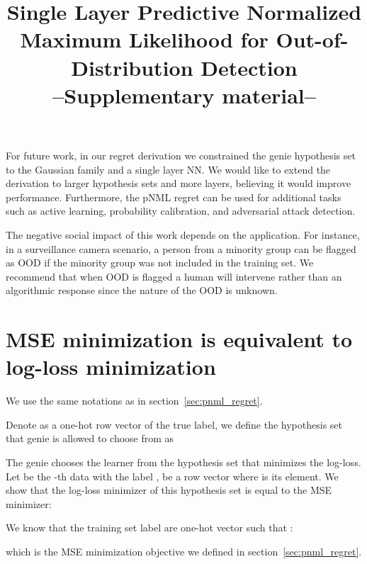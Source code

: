 \documentclass{article}
\def\secref#1{section~\ref{#1}}
\newcommand{\minisection}[1]{\vspace{2mm}\noindent{\textbf{#1.}}}
\begin{document}
\label{sec:limitations}
For future work, in our regret derivation we constrained the genie hypothesis set to the Gaussian family and a single layer NN. We would like to extend the derivation to larger hypothesis sets and more layers, believing it would improve performance.
Furthermore, the pNML regret can be used for additional tasks such as active learning, probability calibration, and adversarial attack detection.

\minisection{Societal impacts} \label{sec:social_impacts}
The negative social impact of this work depends on the application. For instance, in a surveillance camera scenario, a person from a minority group can be flagged as OOD if the minority group was not included in the training set.
We recommend that when OOD is flagged a human will intervene rather than an algorithmic response since the nature of the OOD is unknown.


\FloatBarrier




\setcounter{equation}{0}
\setcounter{figure}{0}
\setcounter{table}{0}
\setcounter{page}{1}


\appendix
\onecolumn
\title{Single Layer Predictive Normalized Maximum Likelihood for Out-of-Distribution Detection \\  --Supplementary material--}


\maketitle

\section{MSE minimization is equivalent to log-loss minimization}
\label{appendix:logloss}
We use the same notations as in \secref{sec:pnml_regret}.

Denote  as a one-hot row vector of the true label, we define the hypothesis set that genie is allowed to choose from as

The genie chooses the learner from the hypothesis set that minimizes the log-loss.
Let  be the -th data with the label ,
 be a row vector where  is its  element.
We show that the log-loss minimizer of this hypothesis set is equal to the MSE minimizer:

We know that the training set label are one-hot vector  such that :

which is the MSE minimization objective we defined in \secref{sec:pnml_regret}.
\end{document}
